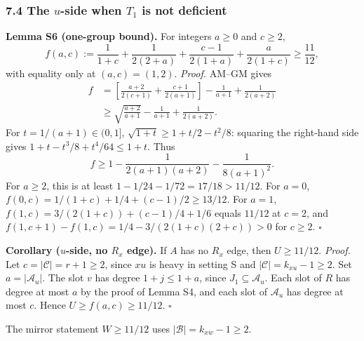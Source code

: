 \subsubsection*{7.4 The $u$-side when $T_1$ is not deficient}
\textbf{Lemma S6 (one-group bound).} For integers $a\ge0$ and $c\ge2$,
\[
 f(a,c):=\frac1{1+c}+\frac1{2(2+a)}+\frac{c-1}{2(1+a)}+\frac a{2(1+c)}\ge\frac{11}{12},
\]
with equality only at $(a,c)=(1,2)$.
\emph{Proof.} AM--GM gives
\[
\begin{aligned}
 f&=\left[\frac{a+2}{2(c+1)}+\frac{c+1}{2(a+1)}\right]-\frac1{a+1}+\frac1{2(a+2)}\\
 &\ge\sqrt{\frac{a+2}{a+1}}-\frac1{a+1}+\frac1{2(a+2)}.
\end{aligned}
\]
For $t=1/(a+1)\in(0,1]$, $\sqrt{1+t}\ge1+t/2-t^2/8$: squaring the right-hand side gives $1+t-t^3/8+t^4/64\le1+t$. Thus
\[
 f\ge1-\frac1{2(a+1)(a+2)}-\frac1{8(a+1)^2}.
\]
For $a\ge2$, this is at least $1-1/24-1/72=17/18>11/12$. For $a=0$, $f(0,c)=1/(1+c)+1/4+(c-1)/2\ge13/12$. For $a=1$, $f(1,c)=3/(2(1+c))+(c-1)/4+1/6$ equals $11/12$ at $c=2$, and $f(1,c+1)-f(1,c)=1/4-3/(2(1+c)(2+c))>0$ for $c\ge2$. \hfill$\square$

\textbf{Corollary ($u$-side, no $R_x$ edge).} If $A$ has no $R_x$ edge, then $U\ge11/12$.
\emph{Proof.} Let $c=|\mathcal C|=r+1\ge2$, since $xu$ is heavy in setting S and $|\mathcal C|=k_{xu}-1\ge2$. Set $a=|\mathcal A_u|$. The slot $v$ has degree $1+j\le1+a$, since $J_1\subseteq\mathcal A_u$. Each slot of $R$ has degree at most $a$ by the proof of Lemma S4, and each slot of $\mathcal A_u$ has degree at most $c$. Hence $U\ge f(a,c)\ge11/12$. \hfill$\square$

The mirror statement $W\ge11/12$ uses $|\mathcal B|=k_{xw}-1\ge2$.

